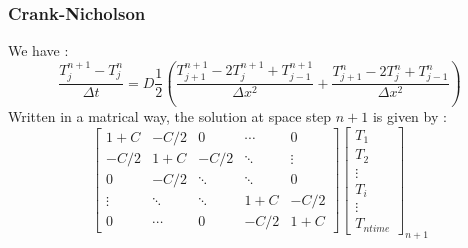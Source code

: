 \documentclass{article}
\begin{document}
                \subsubsection{Crank-Nicholson}
                    We have :
                    \begin{equation}
                        \frac{T_{j}^{n+1} - T_{j}^n}{\Delta t} = D\frac{1}{2} (\frac{T_{j+1}^{n+1}- 2T_{j}^{n+1} + T_{j-1}^{n+1}}{\Delta x^2}+\frac{T_{j+1}^{n}- 2T_{j}^{n} + T_{j-1}^{n}}{\Delta x^2})
                    \end{equation}
                    Written in a matrical way, the solution at space step $n+1$ is given by :
                    \begin{equation}
                        \begin{bmatrix}
                            1+C    & -C/2   & 0     & \cdots & 0 \\
                            -C/2   & 1+C    & -C/2   & \ddots & \vdots \\
                            0      & -C/2   & \ddots & \ddots & 0 \\
                            \vdots & \ddots & \ddots & 1+C   & -C/2\\
                            0      & \cdots & 0      & -C/2   & 1+C
                        \end{bmatrix}
                        \begin{bmatrix}
                            T_{1} \\
                            T_{2} \\
                            \vdots \\
                            T_{i} \\
                            \vdots \\
                            T_{ntime}
                        \end{bmatrix}_{n+1}
                        \label{eq:crank}
                    \end{equation}
\end{document}
